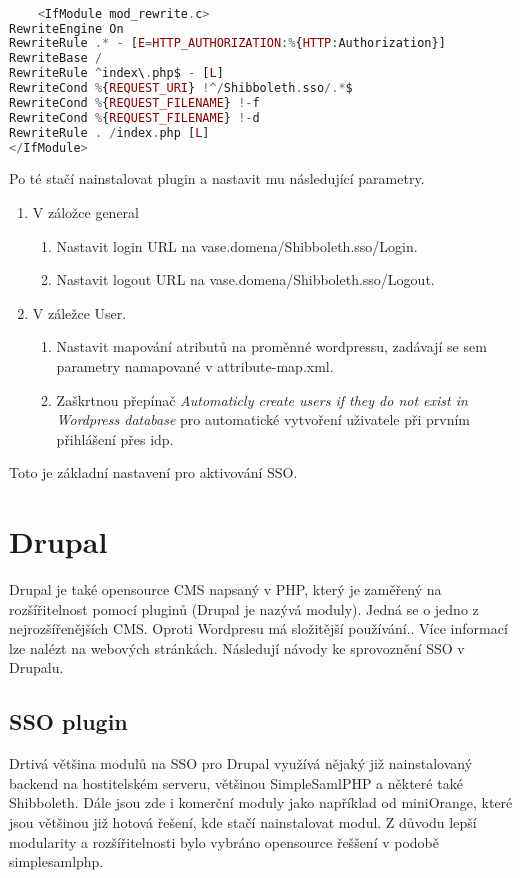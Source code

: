 \begin{lstlisting}[language=php]

    <IfModule mod_rewrite.c>
RewriteEngine On
RewriteRule .* - [E=HTTP_AUTHORIZATION:%{HTTP:Authorization}]
RewriteBase /
RewriteRule ^index\.php$ - [L]
RewriteCond %{REQUEST_URI} !^/Shibboleth.sso/.*$
RewriteCond %{REQUEST_FILENAME} !-f
RewriteCond %{REQUEST_FILENAME} !-d
RewriteRule . /index.php [L]
</IfModule>


\end{lstlisting}

Po té stačí nainstalovat plugin a nastavit mu následující parametry.

\begin{enumerate}
    \item V záložce general
    \begin{enumerate}
        \item Nastavit login URL na vase.domena/Shibboleth.sso/Login.
        \item Nastavit logout URL na vase.domena/Shibboleth.sso/Logout.
    \end{enumerate}
    \item V záležce User.
     \begin{enumerate}
        \item Nastavit mapování atributů na proměnné wordpressu, zadávají se sem parametry namapované v attribute-map.xml.
        \item Zaškrtnou přepínač \emph{Automaticly create users if they do not exist in Wordpress database} pro automatické vytvoření uživatele při prvním přihlášení přes idp.
     \end{enumerate}
\end{enumerate}

Toto je základní nastavení pro aktivování SSO.

\section{Drupal} %

Drupal je také opensource CMS napsaný v PHP, který je zaměřený na rozšířitelnost pomocí pluginů (Drupal je nazývá moduly). Jedná se o jedno z nejrozšířenějších CMS. Oproti Wordpresu má složitější používání.. Více informací lze nalézt na webových stránkách.\cite{drupal}
Následují návody ke sprovoznění SSO v Drupalu.

\subsection{SSO plugin} %
Drtivá většina modulů na SSO pro Drupal využívá nějaký již nainstalovaný backend na hostitelském serveru, většinou SimpleSamlPHP a některé také Shibboleth. Dále jsou zde i komerční moduly jako například od miniOrange\cite{miniorange}, které jsou většinou již hotová řešení, kde stačí nainstalovat modul. Z důvodu lepší modularity a rozšířitelnosti bylo vybráno opensource řeššení v podobě simplesamlphp.

